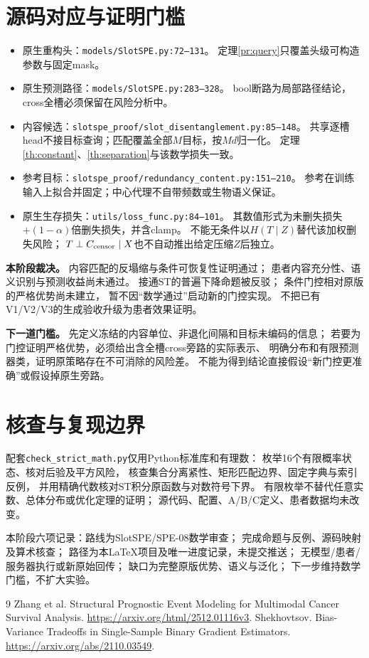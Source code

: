 \documentclass[UTF8,fontset=fandol,11pt,a4paper]{ctexart}
\theoremstyle{remark}
\begin{document}
\section{源码对应与证明门槛}
\begin{itemize}
\item 原生重构头：\texttt{models/SlotSPE.py:72--131}。
定理\ref{pr:query}只覆盖头级可构造参数与固定mask。
\item 原生预测路径：\texttt{models/SlotSPE.py:283--328}。
bool断路为局部路径结论，cross全槽必须保留在风险分析中。
\item 内容候选：\texttt{slotspe\_proof/slot\_disentanglement.py:85--148}。
共享逐槽head不接目标查询；匹配覆盖全部$M$目标，按$Md$归一化。
定理\ref{th:constant}、\ref{th:separation}与该数学损失一致。
\item 参考目标：\texttt{slotspe\_proof/redundancy\_content.py:151--210}。
参考在训练输入上拟合并固定；中心代理不自带频数或生物语义保证。
\item 原生生存损失：\texttt{utils/loss\_func.py:84--101}。
其数值形式为未删失损失$+(1-\alpha)$倍删失损失，并含clamp。
不能无条件以$H(T\mid Z)$替代该加权删失风险；
$T\perp C_{\rm censor}\mid X$也不自动推出给定压缩$Z$后独立。
\end{itemize}

\textbf{本阶段裁决。}
内容匹配的反塌缩与条件可恢复性证明通过；
患者内容充分性、语义识别与预测收益尚未通过。
接通ST的普遍下降命题被反驳；
条件门控相对原版的严格优势尚未建立，
暂不因“数学通过”启动新的门控实现。
不把已有V1/V2/V3的生成验收升级为患者效果证明。

\textbf{下一道门槛。}
先定义冻结的内容单位、非退化间隔和目标未编码的信息；
若要为门控证明严格优势，必须给出含全槽cross旁路的实际表示、
明确分布和有限预测器类，证明原策略存在不可消除的风险差。
不能为得到结论直接假设“新门控更准确”或假设掉原生旁路。

\section{核查与复现边界}
配套\texttt{check\_strict\_math.py}仅用Python标准库和有理数：
枚举16个有限概率状态、核对后验及平方风险，
核查集合分离紧性、矩形匹配边界、固定字典与索引反例，
并用精确代数核对ST积分原函数与对数符号下界。
有限枚举不替代任意实数、总体分布或优化定理的证明；
源代码、配置、A/B/C定义、患者数据均未改变。

本阶段六项记录：路线为SlotSPE/SPE-08数学审查；
完成命题与反例、源码映射及算术核查；
路径为本LaTeX项目及唯一进度记录，未提交推送；
无模型/患者/服务器执行或新原始回传；
缺口为完整原版优势、语义与泛化；
下一步维持数学门槛，不扩大实验。

\begin{thebibliography}{9}
 Zhang et al. Structural Prognostic Event Modeling for Multimodal Cancer Survival Analysis.
\url{https://arxiv.org/html/2512.01116v3}.
 Shekhovtsov. Bias-Variance Tradeoffs in Single-Sample Binary Gradient Estimators.
\url{https://arxiv.org/abs/2110.03549}.
\end{thebibliography}
\end{document}
